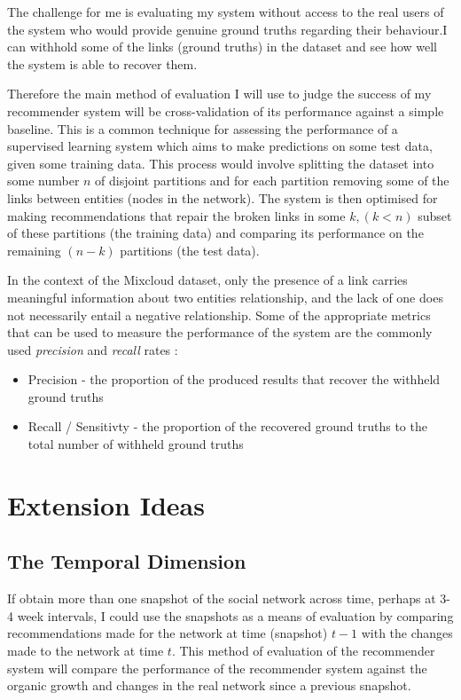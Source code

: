 The challenge for me is evaluating my system without access to the real users of the system who would provide genuine ground truths regarding their behaviour\cite{eval_cfsys}.I can withhold some of the links (ground truths) in the dataset and see how well the system is able to recover them.

Therefore the main method of evaluation I will use to judge the success of my recommender system will be cross-validation of its performance against a simple baseline. This is a common technique for assessing the performance of a supervised learning system which aims to make predictions on some test data, given some training data. This process would involve splitting the dataset into some number $n$ of disjoint partitions and for each partition removing some of the links between entities (nodes in the network). The system is then optimised for making recommendations that repair the broken links in some $k, (k < n)$ subset of these partitions (the training data) and comparing its performance on the remaining $(n-k)$ partitions (the test data). 

In the context of the Mixcloud dataset, only the presence of a link carries meaningful information about two entities relationship, and the lack of one does not necessarily entail a negative relationship. Some of the appropriate metrics that can be used to measure the performance of the system are the commonly used \emph{precision} and \emph{recall} rates \cite{eval_measures}:
\begin{itemize}
 \item Precision - the proportion of the produced results that recover the withheld ground truths
 \item Recall / Sensitivty - the proportion of the recovered ground truths to the total number of withheld ground truths
\end{itemize}

\section{Extension Ideas}

\subsection*{The Temporal Dimension}
If obtain more than one snapshot of the social network across time, perhaps at 3-4 week intervals, I could use the snapshots as a means of evaluation by comparing recommendations made for the network at time (snapshot) $t-1$ with the changes made to the network at time $t$. This method of evaluation of the recommender system will compare the performance of the recommender system against the organic growth and changes in the real network since a previous snapshot.


